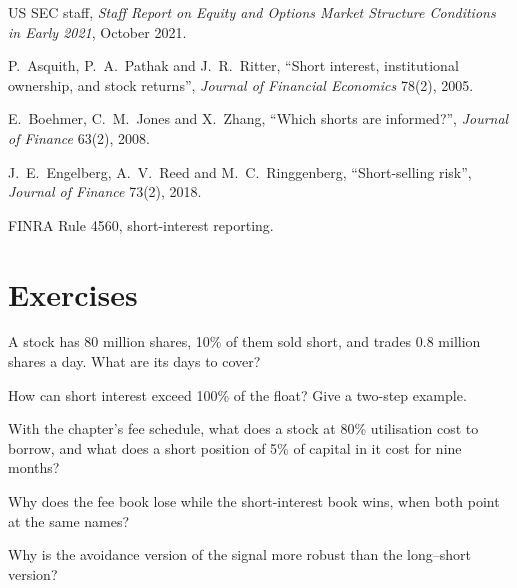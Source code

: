 \begin{omsources}
\item US SEC staff, \emph{Staff Report on Equity and Options Market Structure Conditions in Early 2021}, October 2021.
\item P.~Asquith, P.~A.~Pathak and J.~R.~Ritter, ``Short interest, institutional ownership, and stock returns'', \emph{Journal of Financial Economics}
78(2), 2005.
\item E.~Boehmer, C.~M.~Jones and X.~Zhang, ``Which shorts are informed?'', \emph{Journal of Finance} 63(2), 2008.
\item J.~E.~Engelberg, A.~V.~Reed and M.~C.~Ringgenberg, ``Short-selling risk'', \emph{Journal of Finance} 73(2), 2018.
\item FINRA Rule 4560, short-interest reporting.
\end{omsources}

\section{Exercises}

\begin{exercise}[$\star$]\label{exo:s1:short-interest-borrow-and-crowding:1}
A stock has 80 million shares, 10\% of them sold short, and trades 0.8 million shares a day. What are its days to cover?
\end{exercise}

\begin{exercise}[$\star$]\label{exo:s1:short-interest-borrow-and-crowding:2}
How can short interest exceed 100\% of the float? Give a two-step example.
\end{exercise}

\begin{exercise}[$\star$]\label{exo:s1:short-interest-borrow-and-crowding:3}
With the chapter's fee schedule, what does a stock at 80\% utilisation cost to borrow, and what does a short position of 5\% of capital in it cost for
nine months?
\end{exercise}

\begin{exercise}[$\star\star$]\label{exo:s1:short-interest-borrow-and-crowding:4}
Why does the fee book lose while the short-interest book wins, when both point at the same names?
\end{exercise}

\begin{exercise}[$\star\star$]\label{exo:s1:short-interest-borrow-and-crowding:5}
Why is the avoidance version of the signal more robust than the long--short version?
\end{exercise}

